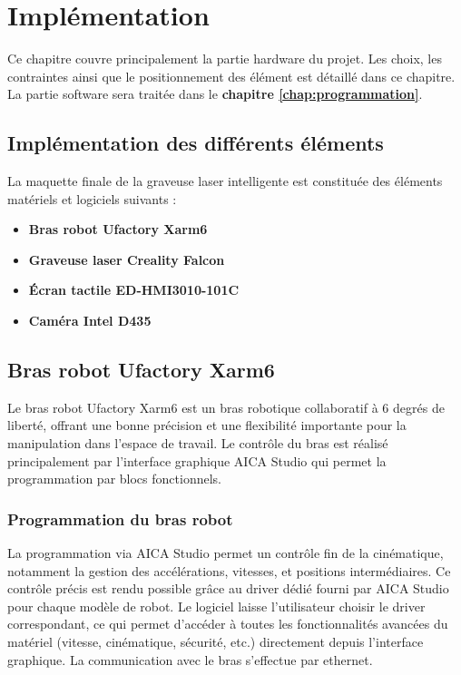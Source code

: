\chapter{Implémentation}
\label{chap:implémentation}

Ce chapitre couvre principalement la partie \gls{hardware} du projet. Les choix, les contraintes ainsi que le positionnement des élément est détaillé dans ce chapitre. La partie \gls{software} sera traitée dans le \textbf{chapitre \ref{chap:programmation}}.

\section{Implémentation des différents éléments}

La maquette finale de la graveuse laser intelligente est constituée des éléments matériels et logiciels suivants :

\begin{itemize}
    \item \textbf{Bras robot Ufactory Xarm6}
    \item \textbf{Graveuse laser Creality Falcon}
    \item \textbf{Écran tactile ED-HMI3010-101C}
    \item \textbf{Caméra Intel D435}
\end{itemize}

\section{Bras robot Ufactory Xarm6}

Le bras robot Ufactory Xarm6 est un bras robotique collaboratif à 6 degrés de liberté, offrant une bonne précision et une flexibilité importante pour la manipulation dans l'espace de travail. Le contrôle du bras est réalisé principalement par l’interface graphique AICA Studio qui permet la programmation par blocs fonctionnels.

\subsection{Programmation du bras robot}
La programmation via AICA Studio permet un contrôle fin de la cinématique, notamment la gestion des accélérations, vitesses, et positions intermédiaires. Ce contrôle précis est rendu possible grâce au driver dédié fourni par AICA Studio pour chaque modèle de robot. Le logiciel laisse l'utilisateur choisir le driver correspondant, ce qui permet d’accéder à toutes les fonctionnalités avancées du matériel (vitesse, cinématique, sécurité, etc.) directement depuis l’interface graphique. La communication avec le bras s’effectue par ethernet.

